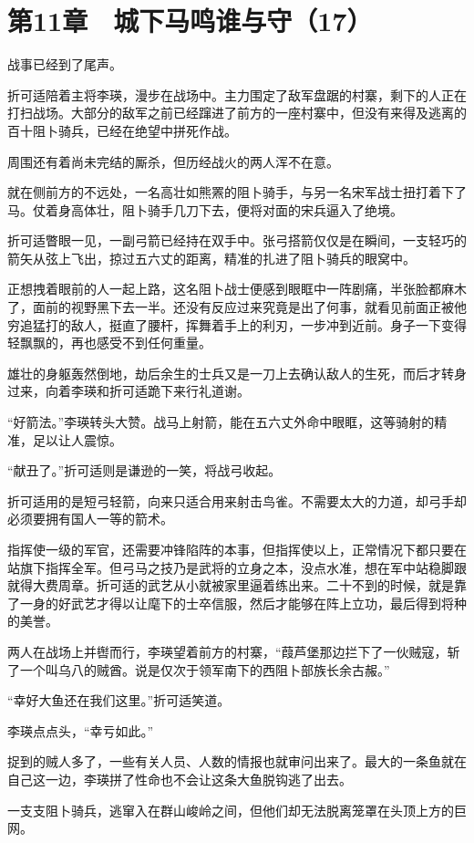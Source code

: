 \section{第11章　城下马鸣谁与守（17）}

战事已经到了尾声。

折可适陪着主将李瑛，漫步在战场中。主力围定了敌军盘踞的村寨，剩下的人正在打扫战场。大部分的敌军之前已经蹿进了前方的一座村寨中，但没有来得及逃离的百十阻卜骑兵，已经在绝望中拼死作战。

周围还有着尚未完结的厮杀，但历经战火的两人浑不在意。

就在侧前方的不远处，一名高壮如熊罴的阻卜骑手，与另一名宋军战士扭打着下了马。仗着身高体壮，阻卜骑手几刀下去，便将对面的宋兵逼入了绝境。

折可适瞥眼一见，一副弓箭已经持在双手中。张弓搭箭仅仅是在瞬间，一支轻巧的箭矢从弦上飞出，掠过五六丈的距离，精准的扎进了阻卜骑兵的眼窝中。

正想拽着眼前的人一起上路，这名阻卜战士便感到眼眶中一阵剧痛，半张脸都麻木了，面前的视野黑下去一半。还没有反应过来究竟是出了何事，就看见前面正被他穷追猛打的敌人，挺直了腰杆，挥舞着手上的利刃，一步冲到近前。身子一下变得轻飘飘的，再也感受不到任何重量。

雄壮的身躯轰然倒地，劫后余生的士兵又是一刀上去确认敌人的生死，而后才转身过来，向着李瑛和折可适跪下来行礼道谢。

“好箭法。”李瑛转头大赞。战马上射箭，能在五六丈外命中眼眶，这等骑射的精准，足以让人震惊。

“献丑了。”折可适则是谦逊的一笑，将战弓收起。

折可适用的是短弓轻箭，向来只适合用来射击鸟雀。不需要太大的力道，却弓手却必须要拥有国人一等的箭术。

指挥使一级的军官，还需要冲锋陷阵的本事，但指挥使以上，正常情况下都只要在站旗下指挥全军。但弓马之技乃是武将的立身之本，没点水准，想在军中站稳脚跟就得大费周章。折可适的武艺从小就被家里逼着练出来。二十不到的时候，就是靠了一身的好武艺才得以让麾下的士卒信服，然后才能够在阵上立功，最后得到将种的美誉。

两人在战场上并辔而行，李瑛望着前方的村寨，“葭芦堡那边拦下了一伙贼寇，斩了一个叫乌八的贼酋。说是仅次于领军南下的西阻卜部族长余古赧。”

“幸好大鱼还在我们这里。”折可适笑道。

李瑛点点头，“幸亏如此。”

捉到的贼人多了，一些有关人员、人数的情报也就审问出来了。最大的一条鱼就在自己这一边，李瑛拼了性命也不会让这条大鱼脱钩逃了出去。

一支支阻卜骑兵，逃窜入在群山峻岭之间，但他们却无法脱离笼罩在头顶上方的巨网。

